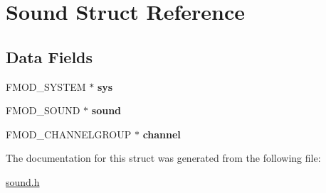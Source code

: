 \hypertarget{struct_sound}{\section{Sound Struct Reference}
\label{struct_sound}
}
\subsection*{Data Fields}
\begin{DoxyCompactItemize}
\item 
\hypertarget{struct_sound_ae043bb23ee313709e1c605dd6c06d317}{F\-M\-O\-D\-\_\-\-S\-Y\-S\-T\-E\-M $\ast$ {\bfseries sys}}\label{struct_sound_ae043bb23ee313709e1c605dd6c06d317}

\item 
\hypertarget{struct_sound_a880526eed3f840c9b8c7b29f61e7eb88}{F\-M\-O\-D\-\_\-\-S\-O\-U\-N\-D $\ast$ {\bfseries sound}}\label{struct_sound_a880526eed3f840c9b8c7b29f61e7eb88}

\item 
\hypertarget{struct_sound_a9adf3e693943484021a510ef6970ac3c}{F\-M\-O\-D\-\_\-\-C\-H\-A\-N\-N\-E\-L\-G\-R\-O\-U\-P $\ast$ {\bfseries channel}}\label{struct_sound_a9adf3e693943484021a510ef6970ac3c}

\end{DoxyCompactItemize}


The documentation for this struct was generated from the following file\-:\begin{DoxyCompactItemize}
\item 
\hyperlink{sound_8h}{sound.\-h}\end{DoxyCompactItemize}
